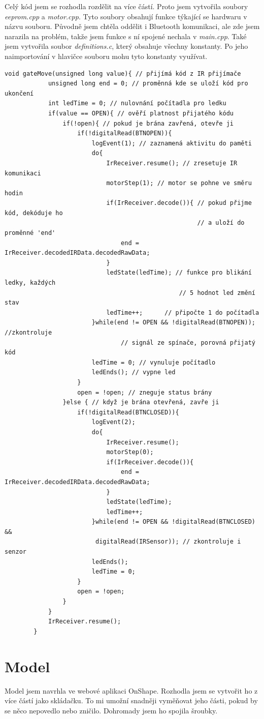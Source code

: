 \documentclass[12pt, a4paper,
twoside,        %
openright
]{report}
\begin{document}
	Celý kód jsem se rozhodla rozdělit na více částí. Proto jsem vytvořila soubory \textit{eeprom.cpp} a \textit{motor.cpp}. Tyto soubory obsahují funkce týkající se hardwaru v názvu souboru. Původně jsem chtěla oddělit i Bluetooth komunikaci, ale zde jsem narazila na problém, takže jsem funkce s ní spojené nechala v \textit{main.cpp}. Také jsem vytvořila soubor \textit{definitions.c}, který obsahuje všechny konstanty. Po jeho naimportování v hlavičce souboru mohu tyto konstanty využívat.
	
	\begin{lstlisting}[style=JavaScript, caption={Ukázka funkce gateMove() ze souboru \textit{main.cpp}.}]
		void gateMove(unsigned long value){ // přijímá kód z IR přijímače
			unsigned long end = 0; // proměnná kde se uloží kód pro ukončení
			int ledTime = 0; // nulovnání počítadla pro ledku
			if(value == OPEN){ // ověří platnost přijatého kódu
				if(!open){ // pokud je brána zavřená, otevře ji
					if(!digitalRead(BTNOPEN)){
						logEvent(1); // zaznamená aktivitu do paměti
						do{
							IrReceiver.resume(); // zresetuje IR komunikaci 
							motorStep(1); // motor se pohne ve směru hodin
							if(IrReceiver.decode()){ // pokud přijme kód, dekóduje ho
													 // a uloží do proměnné 'end'
								end = IrReceiver.decodedIRData.decodedRawData;
							}
							ledState(ledTime); // funkce pro blikání ledky, každých 
												// 5 hodnot led změní stav
							ledTime++;		// připočte 1 do počítadla
						}while(end != OPEN && !digitalRead(BTNOPEN)); //zkontroluje
								// signál ze spínače, porovná přijatý kód
						ledTime = 0; // vynuluje počítadlo
						ledEnds(); // vypne led
					}
					open = !open; // zneguje status brány
				}else { // když je brána otevřená, zavře ji
					if(!digitalRead(BTNCLOSED)){
						logEvent(2);
						do{
							IrReceiver.resume();
							motorStep(0);
							if(IrReceiver.decode()){
								end = IrReceiver.decodedIRData.decodedRawData;
							}
							ledState(ledTime);
							ledTime++;
						}while(end != OPEN && !digitalRead(BTNCLOSED) && 
						 digitalRead(IRSensor)); // zkontroluje i senzor
						ledEnds();
						ledTime = 0;
					}
					open = !open;
				}
			}
			IrReceiver.resume();
		}
	\end{lstlisting}
	
	\section[Model]{Model}
	Model jsem navrhla ve webové aplikaci OnShape. Rozhodla jsem se vytvořit ho z více částí jako skládačku. To mi umožní snadněji vyměňovat jeho části, pokud by se něco nepovedlo nebo zničilo. Dohromady jsem ho spojila šroubky.
	
\end{document}
